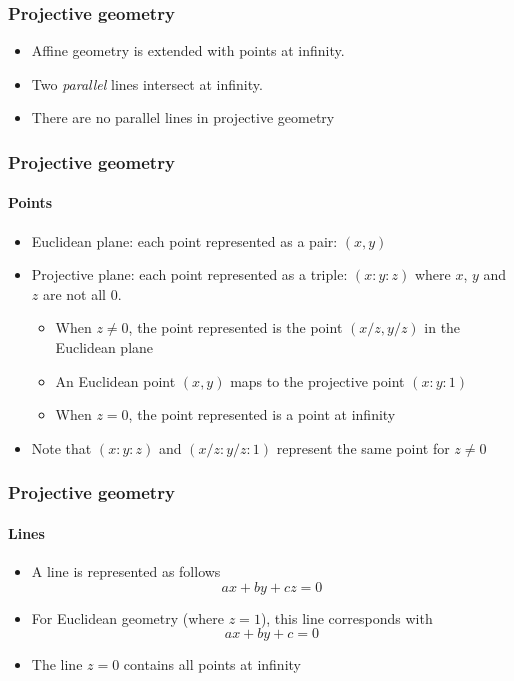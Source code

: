 \documentclass{beamer}
\begin{document}
  \begin{frame}
  	\frametitle{Projective geometry}
	\begin{itemize}
		\item Affine geometry is extended with points at infinity.
		\item Two \emph{parallel} lines intersect at infinity.
		\begin{center}
		\end{center}
		\item There are no parallel lines in projective geometry
	\end{itemize}
  \end{frame}
  \begin{frame}
  	\frametitle{Projective geometry}
	\framesubtitle{Points}
	\begin{itemize}
		\item Euclidean plane: each point represented as a pair: $(x,y)$
		\item Projective plane: each point represented as a triple: $(x : y : z)$ where $x$, $y$ and $z$ are not all $0$.
		\begin{itemize}
		\item When $z \neq 0$, the point represented is the point $(x/z, y/z)$ in the Euclidean plane
		\item An Euclidean point $(x,y)$ maps to the projective point $(x : y : 1)$
		\item When $z = 0$, the point represented is a point at infinity
		\end{itemize}
		\item Note that $(x:y:z)$ and $(x/z : y/z : 1)$ represent the same point for $z \neq 0$
	\end{itemize}
  \end{frame}
  \begin{frame}
  	\frametitle{Projective geometry}
	\framesubtitle{Lines}
	\begin{itemize}
		\item A line is represented as follows \[
			ax + by + cz = 0
			\]
		\item For Euclidean geometry (where $z = 1$), this line corresponds with \[
			ax + by + c = 0
			\]
		\item The line $z = 0$ contains all points at infinity
	\end{itemize}
  \end{frame}
\end{document}
